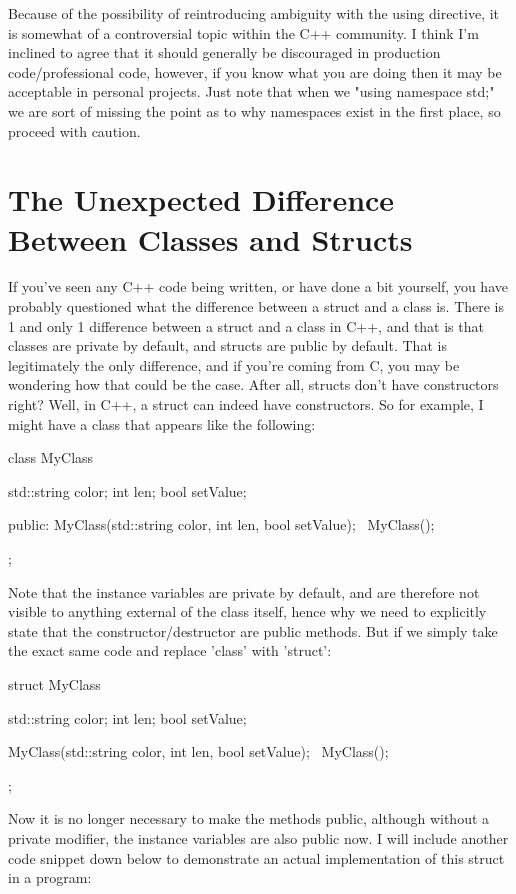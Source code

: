 \documentclass{article}
\begin{document}
Because of the possibility of reintroducing ambiguity with the using directive, it is somewhat of a
controversial topic within the C++ community. I think I’m inclined to agree that it should generally be
discouraged in production code/professional code, however, if you know what you are doing then it may be
acceptable in personal projects. Just note that when we "using namespace std;" we are sort of missing the point
as to why namespaces exist in the first place, so proceed with caution.

\section{The Unexpected Difference Between Classes and Structs}

If you've seen any C++ code being written, or have done a bit yourself, you have probably questioned what the
difference between a struct and a class is. There is 1 and only 1 difference between a struct and a class in
C++, and that is that classes are private by default, and structs are public by default. That is legitimately
the only difference, and if you're coming from C, you may be wondering how that could be the case. After all,
structs don't have constructors right? Well, in C++, a struct can indeed have constructors. So for example, I
might have a class that appears like the following:

\begin{cpplst}
class MyClass {
	std::string color;
	int len;
	bool setValue;

public:
	MyClass(std::string color, int len, bool setValue);
	~MyClass();
};
\end{cpplst}

Note that the instance variables are private by default, and are therefore not visible to anything external of
the class itself, hence why we need to explicitly state that the constructor/destructor are public methods. But
if we simply take the exact same code and replace 'class' with 'struct':

\begin{cpplst}
struct MyClass {
	std::string color;
	int len;
	bool setValue;

	MyClass(std::string color, int len, bool setValue);
	~MyClass();
};
\end{cpplst}

Now it is no longer necessary to make the methods public, although without a private modifier, the instance
variables are also public now. I will include another code snippet down below to demonstrate an actual
implementation of this struct in a program:
\end{document}
